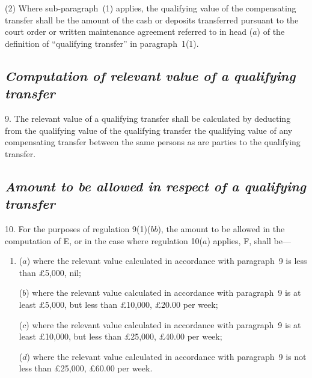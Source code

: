 \documentclass[12pt,a4paper]{article}
\begin{document}
(2) Where sub-paragraph~(1) applies, the qualifying value of the compensating transfer shall be the amount of the cash or deposits transferred pursuant to the court order or written maintenance agreement referred to in head ($a$) of the definition of “qualifying transfer” in paragraph~1(1).


\subsection*{\itshape Computation of relevant value of a qualifying transfer}

9.  The relevant value of a qualifying transfer shall be calculated by deducting from the qualifying value of the qualifying transfer the qualifying value of any compensating transfer between the same persons as are parties to the qualifying transfer.

\subsection*{\itshape Amount to be allowed in respect of a qualifying transfer}

10.  For the purposes of regulation 9(1)($bb$), the amount to be allowed in the computation of E, or in the case where regulation 10($a$) applies, F, shall be—
\begin{enumerate}\item[]
($a$) where the relevant value calculated in accordance with paragraph~9 is less than £5,000, nil;

($b$) where the relevant value calculated in accordance with paragraph~9 is at least £5,000, but less than £10,000, £20$.$00 per week;

($c$) where the relevant value calculated in accordance with paragraph~9 is at least £10,000, but less than £25,000, £40$.$00 per week;

($d$) where the relevant value calculated in accordance with paragraph~9 is not less than £25,000, £60$.$00 per week.
\end{enumerate}

\medskip
\end{document}
